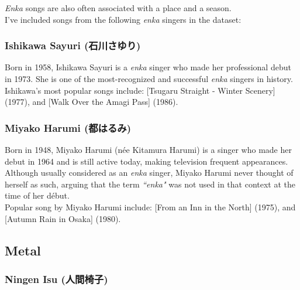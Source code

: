 \emph{Enka} songs are also often associated with a place and a season. \\

I've included songs from the following \emph{enka} singers in the dataset:

\subsubsection{Ishikawa Sayuri (石川さゆり)}

Born in 1958, Ishikawa Sayuri is a \emph{enka} singer who made her professional debut in 1973. She is one of the most-recognized and successful \emph{enka} singers in history. \\

Ishikawa's most popular songs include: 
\href{https://www.youtube.com/watch?v=OJxm9Lt-w6Y}{} [Tsugaru Straight - Winter Scenery] (1977), and
\href{https://www.youtube.com/watch?v=yvc0LadtZUk}{} [Walk Over the Amagi Pass] (1986).


\subsubsection{Miyako Harumi (都はるみ)}

Born in 1948, Miyako Harumi (née Kitamura Harumi) is a singer who made her debut in 1964 and is still active today, making television frequent appearances. \\

Although usually considered as an \emph{enka} singer, Miyako Harumi never thought of herself as such, arguing that the term \emph{``enka"} was not used in that context at the time of her début. \\

Popular song by Miyako Harumi include: \href{https://www.youtube.com/watch?v=QKmma_bRdQE}{} [From an Inn in the North] (1975), and \href{https://www.youtube.com/watch?v=pltL1kuIU4}{} [Autumn Rain in Osaka] (1980). \\


\bigskip



\subsection{Metal}


\subsubsection{Ningen Isu (人間椅子)}

